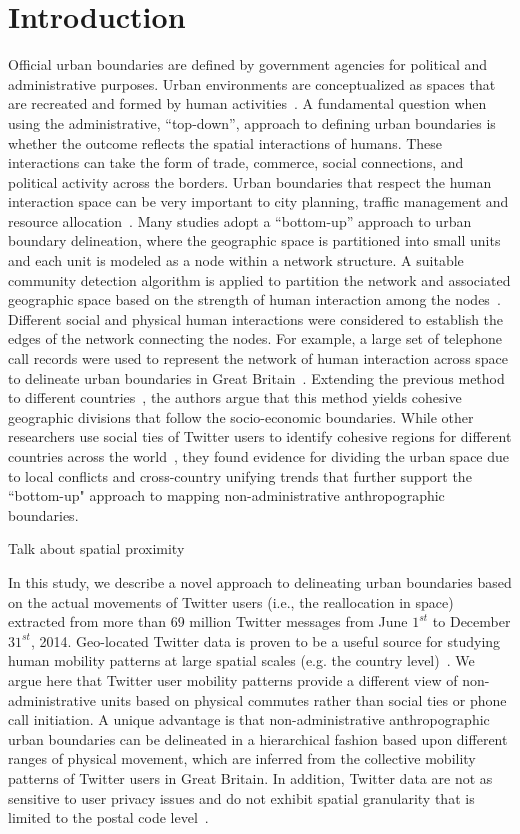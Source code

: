 \documentclass[]{tGIS2e}
\begin{document}
\section{Introduction}
Official urban boundaries are defined by government agencies for political and administrative purposes.
Urban environments are conceptualized as spaces that are recreated and formed by human activities~\citep{schliephake}.
A fundamental question when using the administrative, ``top-down'', approach to defining urban boundaries is whether the outcome reflects the spatial interactions of humans.
These interactions can take the form of trade, commerce, social connections, and political activity across the borders.
Urban boundaries that respect the human interaction space can be very important to city planning, traffic management and resource allocation~\citep{lynch1960,jiang2015,liu2015,long2015}.
Many studies adopt a ``bottom-up'' approach to urban boundary delineation, where the geographic space is partitioned into small units and each unit is modeled as a node within a network structure.
A suitable community detection algorithm is applied to partition the network and associated geographic space based on the strength of human interaction among the nodes~\citep{lancichinetti2009}.
Different social and physical human interactions were considered to establish the edges of the network connecting the nodes.
For example, a large set of telephone call records were used to represent the network of human interaction across space to delineate urban boundaries in Great Britain~\citep{ratti2010}.
Extending the previous method to different countries~\citep{sobolevsky2013}, the authors argue that this method yields cohesive geographic divisions that follow the socio-economic boundaries.
While other researchers use social ties of Twitter users to identify cohesive regions for different countries across the world~\citep{kallus2015}, they found evidence for dividing the urban space due to local conflicts and cross-country unifying trends that further support the ``bottom-up" approach to mapping non-administrative anthropographic boundaries.

Talk about spatial proximity



In this study, we describe a novel approach to delineating urban boundaries based on the actual movements of Twitter users (i.e., the reallocation in space) extracted from more than 69 million Twitter messages from June $1^{st}$ to December $31^{st}$, 2014.
Geo-located Twitter data is proven to be a useful source for studying human mobility patterns at large spatial scales (e.g. the country level)~\citep{hawelka,jurdak2015}.
We argue here that Twitter user mobility patterns provide a different view of non-administrative units based on physical commutes rather than social ties or phone call initiation. 
A unique advantage is that non-administrative anthropographic urban boundaries can be delineated in a hierarchical fashion based upon different ranges of physical movement, which are inferred from the collective mobility patterns of Twitter users in Great Britain. 
In addition, Twitter data are not as sensitive to user privacy issues and do not exhibit spatial granularity that is limited to the postal code level~\citep{thiemann}. 
\end{document}
